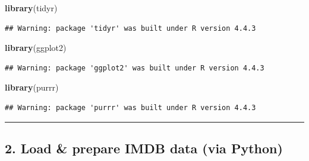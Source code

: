 \documentclass[
]{article}
\newenvironment{Shaded}{\begin{snugshade}}{\end{snugshade}}
\newcommand{\DataTypeTok}[1]{\textcolor[rgb]{0.13,0.29,0.53}{#1}}
\newcommand{\DecValTok}[1]{\textcolor[rgb]{0.00,0.00,0.81}{#1}}
\newcommand{\FunctionTok}[1]{\textcolor[rgb]{0.13,0.29,0.53}{\textbf{#1}}}
\newcommand{\NormalTok}[1]{#1}
\newcommand{\SpecialCharTok}[1]{\textcolor[rgb]{0.81,0.36,0.00}{\textbf{#1}}}
\begin{document}
\begin{Shaded}
\begin{Highlighting}[]
\FunctionTok{library}\NormalTok{(tidyr)}
\end{Highlighting}
\end{Shaded}

\begin{verbatim}
## Warning: package 'tidyr' was built under R version 4.4.3
\end{verbatim}

\begin{Shaded}
\begin{Highlighting}[]
\FunctionTok{library}\NormalTok{(ggplot2)}
\end{Highlighting}
\end{Shaded}

\begin{verbatim}
## Warning: package 'ggplot2' was built under R version 4.4.3
\end{verbatim}

\begin{Shaded}
\begin{Highlighting}[]
\FunctionTok{library}\NormalTok{(purrr)}
\end{Highlighting}
\end{Shaded}

\begin{verbatim}
## Warning: package 'purrr' was built under R version 4.4.3
\end{verbatim}

\begin{Shaded}
\end{Shaded}

\begin{center}\rule{0.5\linewidth}{0.5pt}\end{center}

\subsection{2. Load \& prepare IMDB data (via
Python)}\label{load-prepare-imdb-data-via-python}
\end{document}

